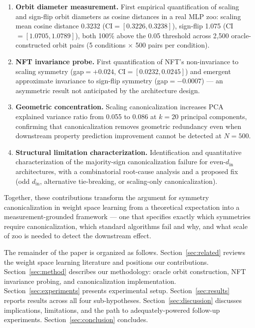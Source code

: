 \begin{enumerate}
\item \textbf{Orbit diameter measurement.} First empirical quantification of scaling and sign-flip orbit diameters as cosine distances in a real MLP zoo: scaling mean cosine distance 0.3232 (CI$=[0.3226, 0.3238]$), sign-flip 1.075 (CI$=[1.0705, 1.0789]$), both 100\% above the 0.05 threshold across 2,500 oracle-constructed orbit pairs (5 conditions $\times$ 500 pairs per condition).

\item \textbf{NFT invariance probe.} First quantification of NFT's non-invariance to scaling symmetry (gap$=+0.024$, CI$=[0.0232, 0.0245]$) and emergent approximate invariance to sign-flip symmetry (gap$=-0.0007$) --- an asymmetric result not anticipated by the architecture design.

\item \textbf{Geometric concentration.} Scaling canonicalization increases PCA explained variance ratio from 0.055 to 0.086 at $k=20$ principal components, confirming that canonicalization removes geometric redundancy even when downstream property prediction improvement cannot be detected at $N=500$.

\item \textbf{Structural limitation characterization.} Identification and quantitative characterization of the majority-sign canonicalization failure for even-$d_{\mathrm{in}}$ architectures, with a combinatorial root-cause analysis and a proposed fix (odd $d_{\mathrm{in}}$, alternative tie-breaking, or scaling-only canonicalization).
\end{enumerate}

Together, these contributions transform the argument for symmetry canonicalization in weight space learning from a theoretical expectation into a measurement-grounded framework --- one that specifies exactly which symmetries require canonicalization, which standard algorithms fail and why, and what scale of zoo is needed to detect the downstream effect.

The remainder of the paper is organized as follows. Section~\ref{sec:related} reviews the weight space learning literature and positions our contributions. Section~\ref{sec:method} describes our methodology: oracle orbit construction, NFT invariance probing, and canonicalization implementation. Section~\ref{sec:experiments} presents experimental setup. Section~\ref{sec:results} reports results across all four sub-hypotheses. Section~\ref{sec:discussion} discusses implications, limitations, and the path to adequately-powered follow-up experiments. Section~\ref{sec:conclusion} concludes.
